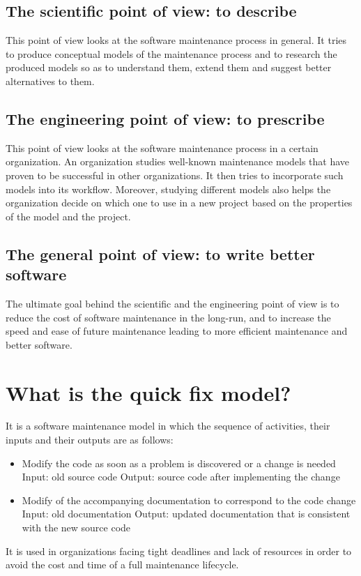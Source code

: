 \documentclass[11pt,a4paper]{article}
\begin{document}
\subsection{The scientific point of view: to describe}
This point of view looks at the software maintenance process in general.
It tries to produce conceptual models of the maintenance process and to research the produced models
so as to understand them, extend them and suggest better alternatives to them.

\subsection{The engineering point of view: to prescribe}
This point of view looks at the software maintenance process in a certain organization.
An organization studies well-known maintenance models that have proven to be successful in other organizations.
It then tries to incorporate such models into its workflow.
Moreover, studying different models also helps the organization decide on which one to use in a new project based on
the properties of the model and the project.

\subsection{The general point of view: to write better software}
The ultimate goal behind the scientific and the engineering point of view is to
reduce the cost of software maintenance in the long-run,
and to increase the speed and ease of future maintenance leading to more efficient maintenance and better software.

\section{What is the quick fix model?}
It is a software maintenance model in which the sequence of activities, their inputs and their outputs are as follows:
\begin{itemize}
    \item Modify the code as soon as a problem is discovered or a change is needed
    \subitem Input: old source code
    \subitem Output: source code after implementing the change
    \item Modify of the accompanying documentation to correspond to the code change
    \subitem Input: old documentation
    \subitem Output: updated documentation that is consistent with the new source code
\end{itemize}
It is used in organizations facing tight deadlines and lack of resources
in order to avoid the cost and time of a full maintenance lifecycle.
\end{document}
